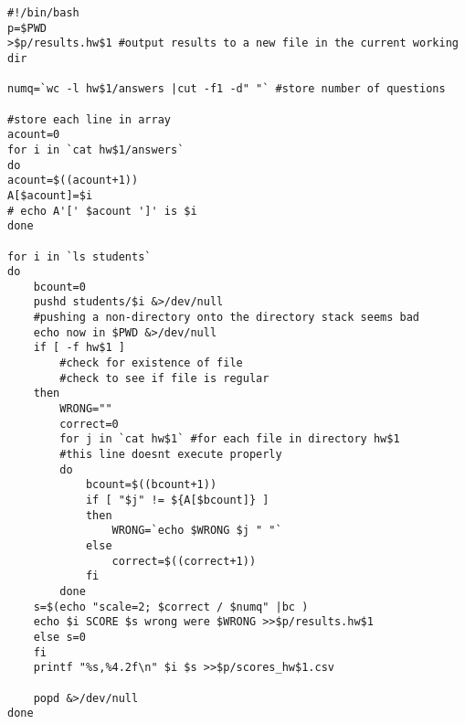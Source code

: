 \documentclass[a4paper]{article}
\begin{document}
\begin{verbatim}
#!/bin/bash
p=$PWD
>$p/results.hw$1 #output results to a new file in the current working dir

numq=`wc -l hw$1/answers |cut -f1 -d" "` #store number of questions

#store each line in array
acount=0
for i in `cat hw$1/answers` 
do
acount=$((acount+1))
A[$acount]=$i
# echo A'[' $acount ']' is $i
done

for i in `ls students`
do
	bcount=0
	pushd students/$i &>/dev/null
	#pushing a non-directory onto the directory stack seems bad
	echo now in $PWD &>/dev/null
	if [ -f hw$1 ] 
		#check for existence of file
		#check to see if file is regular
	then
		WRONG=""
		correct=0
		for j in `cat hw$1` #for each file in directory hw$1
		#this line doesnt execute properly
		do
			bcount=$((bcount+1))
			if [ "$j" != ${A[$bcount]} ]
			then
				WRONG=`echo $WRONG $j " "`
			else
				correct=$((correct+1))
			fi
		done
	s=$(echo "scale=2; $correct / $numq" |bc )
	echo $i SCORE $s wrong were $WRONG >>$p/results.hw$1
	else s=0
	fi
	printf "%s,%4.2f\n" $i $s >>$p/scores_hw$1.csv
	
	popd &>/dev/null
done
\end{verbatim}
\end{document}
